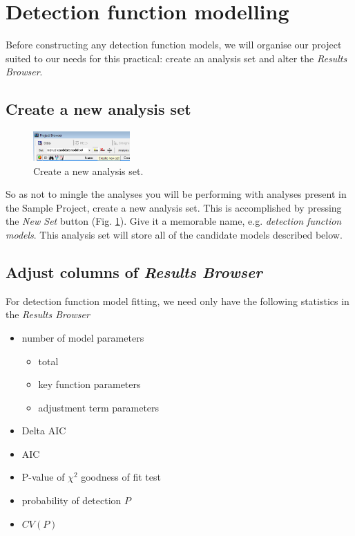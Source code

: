 \documentclass[a4paper, 10pt]{article}
\begin{document}
\section{Detection function modelling}

Before constructing any detection function models, we will organise our project suited to our needs for this practical: create an analysis set and alter the \emph{Results Browser}.

\subsection{Create a new analysis set}
\begin{figure}
\includegraphics[width=0.33\textwidth]{images/new-set.png}
\caption{Create a new analysis set. \label{fig:newset}}
\vspace{-25pt}
\end{figure}


So as not to mingle the analyses you will be performing with analyses present in the Sample Project, create a new analysis set.  This is accomplished by pressing the \emph{New Set} button  (Fig. \ref{fig:newset}).  Give it a memorable name, e.g. \emph{detection function models}.  This analysis set will store all of the candidate models described below.

\subsection{Adjust columns of \emph{Results Browser}}

For detection function model fitting, we need only have the following statistics in the \emph{Results Browser}
\begin{itemize}
	\item number of model parameters
	\begin{itemize}
		\item total
		\item key function parameters
		\item adjustment term parameters
	\end{itemize}
	\item Delta AIC
	\item AIC
	\item P-value of $\chi^2$ goodness of fit test
	\item probability of detection $P$
	\item $CV(P)$
\end{itemize} 
\end{document}
